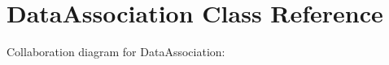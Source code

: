 \hypertarget{classDataAssociation}{}\section{Data\+Association Class Reference}
\label{classDataAssociation}


Collaboration diagram for Data\+Association\+:
